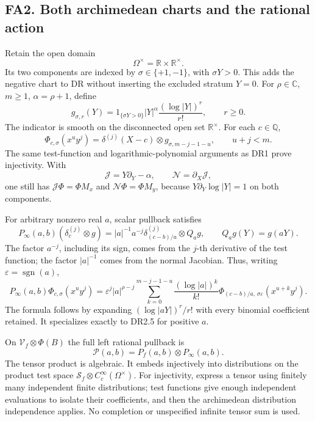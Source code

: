 \subsection{FA2. Both archimedean charts and the rational
action}\label{fa2.-both-archimedean-charts-and-the-rational-action}

Retain the open domain \[
 \Omega^\times=\mathbb R\times\mathbb R^\times.
\tag{FA2.1}
\] Its two components are indexed by \(\sigma\in\{+1,-1\}\), with
\(\sigma Y>0\). This adds the negative chart to DR without inserting the
excluded stratum \(Y=0\). For \(\rho\in\mathbb C\), \(m\ge1\),
\(\alpha=\rho+1\), define \[
 g_{\sigma,r}(Y)
   =1_{\{\sigma Y>0\}}|Y|^\alpha
                \frac{(\log|Y|)^r}{r!},\qquad r\ge0.
\tag{FA2.2}
\] The indicator is smooth on the disconnected open set
\(\mathbb R^\times\). For each \(c\in\mathbb Q\), \[
 \Phi_{c,\sigma}(x^uy^j)
       =\delta^{(j)}(X-c)\otimes g_{\sigma,m-j-1-u},
 \qquad u+j<m.
\tag{FA2.3}
\] The same test-function and logarithmic-polynomial arguments as DR1
prove injectivity. With \[
 \mathscr J=Y\partial_Y-\alpha,\qquad
 \mathscr N=\partial_X\mathscr J,
\] one still has \(\mathscr J\Phi=\Phi M_x\) and
\(\mathscr N\Phi=\Phi M_y\), because \(Y\partial_Y\log|Y|=1\) on both
components.

For arbitrary nonzero real \(a\), scalar pullback satisfies \[
 P_\infty(a,b)
   (\delta_c^{(j)}\otimes g)
   =|a|^{-1}a^{-j}
       \delta_{(c-b)/a}^{(j)}\otimes Q_ag,\qquad
 Q_ag(Y)=g(aY).
\tag{FA2.4}
\] The factor \(a^{-j}\), including its sign, comes from the \(j\)-th
derivative of the test function; the factor \(|a|^{-1}\) comes from the
normal Jacobian. Thus, writing \(\varepsilon=\operatorname{sgn}(a)\), \[
 \boxed{
 P_\infty(a,b)\Phi_{c,\sigma}(x^uy^j)
  =\varepsilon^j|a|^{\rho-j}
     \sum_{k=0}^{m-j-1-u}\frac{(\log|a|)^k}{k!}
       \Phi_{(c-b)/a,\,\sigma\varepsilon}(x^{u+k}y^j).
 }
\tag{FA2.5}
\] The formula follows by expanding \((\log|aY|)^r/r!\) with every
binomial coefficient retained. It specializes exactly to DR2.5 for
positive \(a\).

On \(\mathscr V_f\otimes\Phi(B)\) the full left rational pullback is \[
 \mathcal P(a,b)=P_f(a,b)\otimes P_\infty(a,b).
\tag{FA2.6}
\] The tensor product is algebraic. It embeds injectively into
distributions on the product test space
\(\mathscr S_f\otimes C_c^\infty(\Omega^\times)\). For injectivity,
express a tensor using finitely many independent finite distributions;
test functions give enough independent evaluations to isolate their
coefficients, and then the archimedean distribution independence
applies. No completion or unspecified infinite tensor sum is used.

